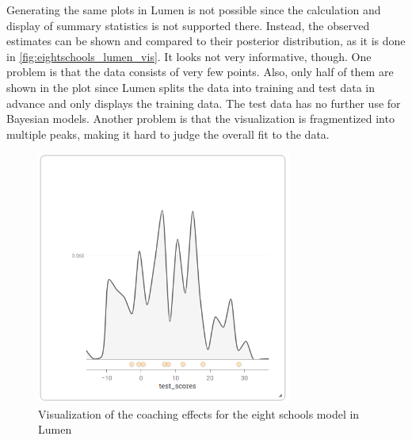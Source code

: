 \documentclass{article}
\begin{document}
Generating the same plots in Lumen is not possible since the calculation and display of summary statistics is not supported there. Instead, the observed estimates can be shown and compared to their posterior distribution, as it is done in \autoref{fig:eightschools_lumen_vis}. It looks not very informative, though. One problem is that the data consists of very few points. Also, only half of them are shown in the plot since Lumen splits the data into training and test data in advance and only displays the training data. The test data has no further use for Bayesian models. Another problem is that the visualization is fragmentized into multiple peaks, making it hard to judge the overall fit to the data.
\begin{figure}
	\centering
	\includegraphics[width=0.75\textwidth]{images/eight_schools_lumen_vis.png}
	\caption[Visualization of the coaching effects for the eight schools model in Lumen]{Visualization of the coaching effects for the eight schools model in Lumen}
	\label{fig:eightschools_lumen_vis}
\end{figure}

\end{document}
